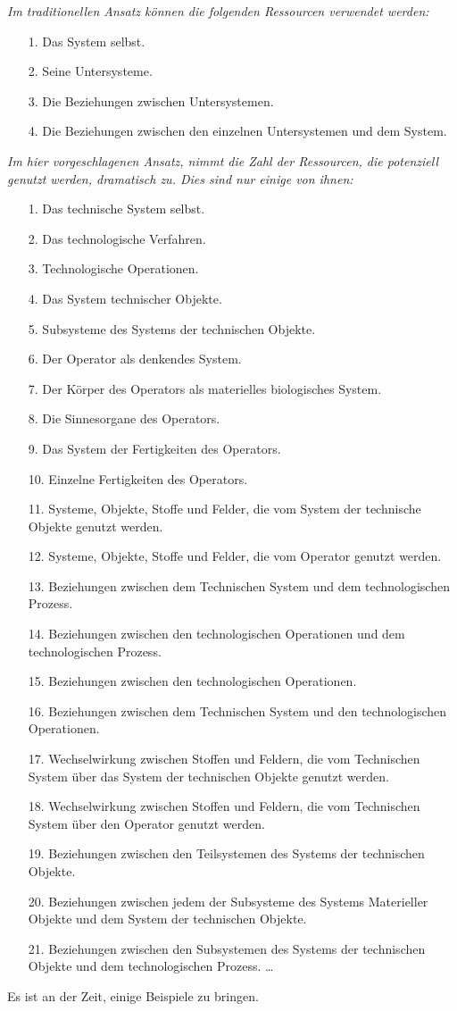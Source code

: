 \documentclass[11pt,a4paper]{article}
\begin{document}
\emph{Im traditionellen Ansatz können die folgenden Ressourcen verwendet
  werden:}
\begin{itemize}\itemsep0pt
\item[1.] Das System selbst.
\item[2.] Seine Untersysteme.
\item[3.] Die Beziehungen zwischen Untersystemen.
\item[4.] Die Beziehungen zwischen den einzelnen Untersystemen und dem System.
\end{itemize}
\emph{Im hier vorgeschlagenen Ansatz, nimmt die Zahl der Ressourcen, die
  potenziell genutzt werden, dramatisch zu. Dies sind nur einige von ihnen: }
\begin{itemize}\itemsep0pt
\item[1.] Das technische System selbst.
\item[2.] Das technologische Verfahren.
\item[3.] Technologische Operationen.
\item[4.] Das System technischer Objekte.
\item[5.] Subsysteme des Systems der technischen Objekte.
\item[6.] Der Operator als denkendes System.
\item[7.] Der Körper des Operators als materielles biologisches System.
\item[8.] Die Sinnesorgane des Operators.
\item[9.] Das System der Fertigkeiten des Operators.
\item[10.] Einzelne Fertigkeiten des Operators.
\item[11.] Systeme, Objekte, Stoffe und Felder, die vom System der technische
  Objekte genutzt werden.
\item[12.] Systeme, Objekte, Stoffe und Felder, die vom Operator genutzt
  werden.
\item[13.] Beziehungen zwischen dem Technischen System und dem technologischen
  Prozess.
\item[14.] Beziehungen zwischen den technologischen Operationen und dem
  technologischen Prozess.
\item[15.] Beziehungen zwischen den technologischen Operationen.
\item[16.] Beziehungen zwischen dem Technischen System und den technologischen
  Operationen.
\item[17.] Wechselwirkung zwischen Stoffen und Feldern, die vom Technischen
  System über das System der technischen Objekte genutzt werden.
\item[18.] Wechselwirkung zwischen Stoffen und Feldern, die vom Technischen
  System über den Operator genutzt werden.
\item[19.] Beziehungen zwischen den Teilsystemen des Systems der technischen
  Objekte.
\item[20.] Beziehungen zwischen jedem der Subsysteme des Systems Materieller
  Objekte und dem System der technischen Objekte.
\item[21.] Beziehungen zwischen den Subsystemen des Systems der technischen
  Objekte und dem technologischen Prozess. \ldots
\end{itemize}
Es ist an der Zeit, einige Beispiele zu bringen. 
\end{document}
